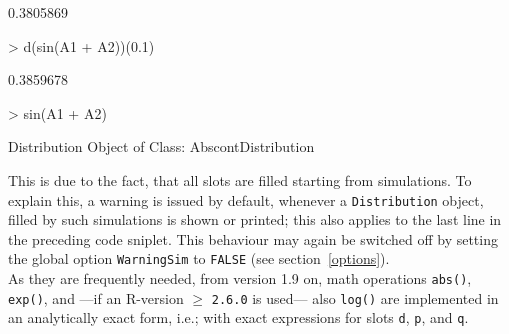 \documentclass[11pt]{article}
\newcommand{\code}[1]{{\tt #1}}
\begin{document}
\begin{Schunk}
\begin{Soutput}
[1] 0.3805869
\end{Soutput}
\begin{Sinput}
>   d(sin(A1 + A2))(0.1)
\end{Sinput}
\begin{Soutput}
[1] 0.3859678
\end{Soutput}
\begin{Sinput}
>   sin(A1 + A2)
\end{Sinput}
\begin{Soutput}
Distribution Object of Class: AbscontDistribution
\end{Soutput}
\end{Schunk}
This is due to the fact, that all slots are filled starting from simulations.
To explain this, a warning is issued  by default, whenever a \code{Distribution}
object, filled by such simulations is shown or printed; this also applies to the
last line in the preceding code sniplet. This behaviour may again be switched
off by setting the global option
\code{WarningSim} to \code{FALSE} (see section~\ref{options}).\\

As they are frequently needed, from version 1.9 on, math operations
\code{abs()}, \code{exp()}, and ---if an {\sf R}-version $\ge$ {\tt 2.6.0} is
used--- also \code{log()} are implemented in an analytically exact form,
i.e.; with exact expressions for slots \code{d}, \code{p}, and \code{q}.

%

\end{document}
\end{Sinput}
\end{Schunk}
\end{document}

